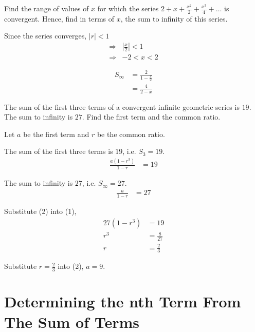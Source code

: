 \documentclass[11pt,a4paper]{book}
\begin{document}
\begin{example}

Find the range of values of $x$ for which the series ${\displaystyle 2+x+\frac{x^{2}}{2}+\frac{x^{3}}{4}+\ldots}$
is convergent. Hence, find in terms of $x$, the sum to infinity of
this series.

\Solution

Since the series converges, $\left|r\right|<1$
\begin{align*}
\Rightarrow & \left|\frac{x}{2}\right|<1\\
\Rightarrow & -2<x<2
\end{align*}

\begin{align*}
S_{\infty} & =\frac{2}{1-\frac{x}{2}}\\
 & =\frac{4}{2-x}
\end{align*}

\end{example}

\newpage

\begin{example}

The sum of the first three terms of a convergent infinite geometric series is $19$. The sum to infinity is $27$. Find the first term and the common ratio.

\Solution

Let $a$ be the first term and $r$ be the common ratio.

The sum of the first three terms is $19$, i.e. $S_{3}=19$.
\begin{align*}
\frac{a\left(1-r^{3}\right)}{1-r} & =19\tag{1}
\end{align*}

The sum to infinity is $27$, i.e. $S_{\infty}=27$.
\begin{align*}
\frac{a}{1-r} & =27\tag{2}
\end{align*}

Substitute (2) into (1),
\begin{align*}
27\left(1-r^{3}\right) & =19\\
r^{3} & =\frac{8}{27}\\
r & =\frac{2}{3}
\end{align*}

Substitute ${\displaystyle r=\frac{2}{3}}$ into (2), $a=9$.

\end{example}


\section{Determining the nth Term From The Sum of Terms}
\end{document}
